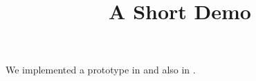 \documentclass[article]{jss}
\title{A Short Demo}
\begin{document}
We implemented a prototype in  and also in .
\end{document}
